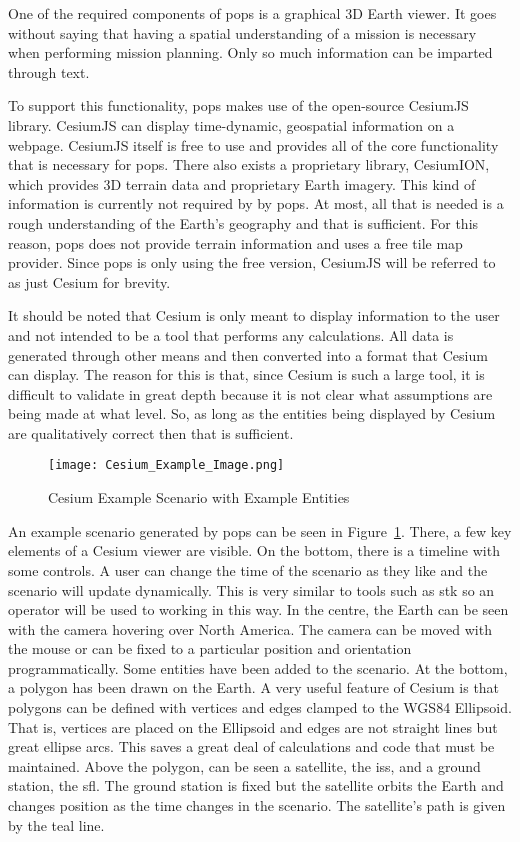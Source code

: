 One of the required components of \gls{pops} is a graphical 3D Earth viewer.
It goes without saying that having a spatial understanding of a mission is
necessary when performing mission planning. Only so much information can be
imparted through text.


To support this functionality, \gls{pops} makes use of the open-source CesiumJS
library. CesiumJS can display time-dynamic, geospatial information on a
webpage. CesiumJS itself is free to use and provides all of the core
functionality that is necessary for \gls{pops}. There also exists a proprietary
library, CesiumION, which provides 3D terrain data and proprietary Earth
imagery. This kind of information is currently not required by by \gls{pops}.
At most, all that is needed is a rough understanding of the Earth's geography
and that is sufficient. For this reason, \gls{pops} does not provide terrain
information and uses a free tile map provider. Since \gls{pops} is only using
the free version, CesiumJS will be referred to as just Cesium for brevity. 

It should be noted that Cesium is only meant to display information to the user
and not intended to be a tool that performs any calculations. All data is generated
through other means and then converted into a format that Cesium can display.
The reason for this is that, since Cesium is such a large tool, it is difficult
to validate in great depth because it is not clear what assumptions are being
made at what level. So, as long as the entities being displayed by Cesium are
qualitatively correct then that is sufficient.

\begin{figure}[h]
    \centering
    \texttt{[image: Cesium\_Example\_Image.png]} 
    \caption{Cesium Example Scenario with Example Entities}
    \label{fig:example_cesium}
\end{figure}

An example scenario generated by \gls{pops} can be seen in
Figure~\ref{fig:example_cesium}. There, a few key elements of a Cesium viewer
are visible. On the bottom, there is a timeline with some controls. A user can
change the time of the scenario as they like and the scenario will update
dynamically. This is very similar to tools such as \gls{stk} so an operator
will be used to working in this way. In the centre, the Earth can be seen with
the camera hovering over North America.  The camera can be moved with the mouse
or can be fixed to a particular position and orientation programmatically.
Some entities have been added to the scenario. At the bottom, a polygon has
been drawn on the Earth. A very useful feature of Cesium is that polygons can
be defined with vertices and edges clamped to the WGS84 Ellipsoid. That is,
vertices are placed on the Ellipsoid and edges are not straight lines but great
ellipse arcs. This saves a great deal of calculations and code that must be
maintained. Above the polygon, can be seen a satellite, the \gls{iss}, and a
ground station, the \gls{sfl}. The ground station is fixed but the satellite
orbits the Earth and changes position as the time changes in the scenario. The
satellite's path is given by the teal line. 

